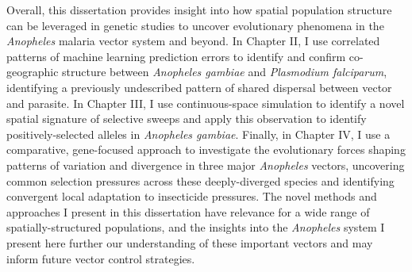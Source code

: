 Overall, this dissertation provides insight into how spatial population structure can be 
leveraged in genetic studies to uncover evolutionary phenomena in the \textit{Anopheles} malaria vector system
and beyond.
In Chapter II, I use correlated patterns of machine learning prediction errors to identify and confirm
co-geographic structure between \textit{Anopheles gambiae} and \textit{Plasmodium falciparum}, 
identifying a previously undescribed pattern of shared dispersal between vector and parasite.
In Chapter III, I use continuous-space simulation to identify a novel spatial signature of selective sweeps
and apply this observation to identify positively-selected alleles in \textit{Anopheles gambiae}.
Finally, in Chapter IV, I use a comparative, gene-focused approach to investigate the evolutionary forces
shaping patterns of variation and divergence in three major \textit{Anopheles} vectors, 
uncovering common selection pressures across these deeply-diverged species and identifying 
convergent local adaptation to insecticide pressures.
The novel methods and approaches I present in this dissertation have relevance for a wide range of 
spatially-structured populations, and the insights into the \textit{Anopheles} system I present here
further our understanding of these important vectors and may inform future vector control strategies. 
